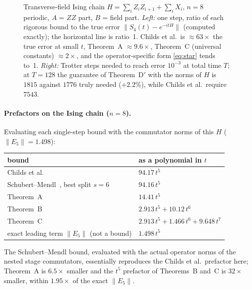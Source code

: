 \documentclass[11pt]{article}
\newcommand{\norm}[1]{\lVert #1\rVert}
\theoremstyle{plain}
\theoremstyle{definition}
\theoremstyle{remark}
\begin{document}
\begin{figure}[ht]
\caption{Transverse-field Ising chain $H=\sum_iZ_iZ_{i+1}+\sum_iX_i$, $n=8$ periodic, $A$ = $ZZ$ part,
$B$ = field part. \emph{Left:} one step, ratio of each rigorous bound to the true error
$\norm{S_4(t)-e^{-itH}}$ (computed exactly); the horizontal line is ratio~1. Childs et al.\ is
$\approx63\times$ the true error at small $t$, Theorem~A $\approx9.6\times$, Theorem~C (universal constants)
$\approx2\times$, and the operator-specific form \eqref{eq:star} tends to~1. \emph{Right:} Trotter steps needed
to reach error $10^{-3}$ at total time $T$; at $T=128$ the guarantee of Theorem~D$'$ with the norms of
$H$ is $1815$ against $1776$ truly needed ($+2.2\%$), while Childs et al.\ require $7543$.}
\label{fig:tfim}
\end{figure}

\paragraph{Prefactors on the Ising chain ($n=8$).} Evaluating each single-step bound with the
commutator norms of this $H$ ($\norm{E_5}=1.498$):
\begin{center}\small
\begin{tabular}{@{}ll@{}}
\toprule
bound & as a polynomial in $t$\\
\midrule
Childs et al.~\cite[(M13)]{Childs2021} & $94.17\,t^5$\\
Schubert--Mendl~\cite[Eq.~(9)]{SchubertMendl2023}, best split $s=6$ & $94.16\,t^5$\\
Theorem~A & $14.41\,t^5$\\
Theorem~B & $2.913\,t^5+10.12\,t^6$\\
Theorem~C & $2.913\,t^5+1.466\,t^6+9.648\,t^7$\\
exact leading term $\norm{E_5}$ (not a bound) & $1.498\,t^5$\\
\bottomrule
\end{tabular}
\end{center}
The Schubert--Mendl bound, evaluated with the actual operator norms of the nested stage commutators,
essentially reproduces the Childs et al.\ prefactor here; Theorem~A is $6.5\times$ smaller and the $t^5$
prefactor of Theorems~B and~C is $32\times$ smaller, within $1.95\times$ of the exact $\norm{E_5}$.
\end{document}
